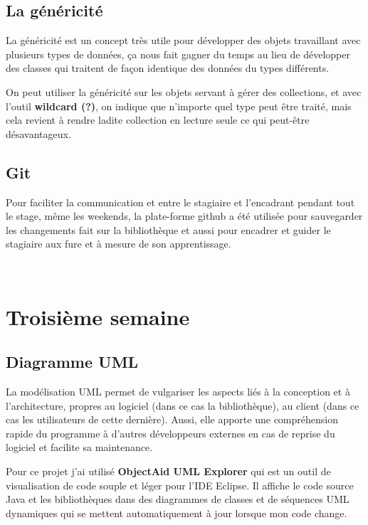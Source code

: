 \documentclass[12pt]{report}
\begin{document}
\subsection{La généricité}
La généricité est un concept très utile pour développer des objets travaillant avec plusieurs types de données, ça nous fait gagner du temps au lieu de développer des classes qui traitent de façon identique des données du types différents.\newline

On peut utiliser la généricité sur les objets servant à gérer des collections, et avec l'outil \textbf{wildcard (?)}, on indique que n'importe quel type peut être traité, mais cela revient à rendre ladite collection en lecture seule ce qui peut-être désavantageux. 

\newpage
\subsection{Git}
Pour faciliter la communication et entre le stagiaire et l'encadrant pendant tout le stage, même les weekends, la plate-forme github a été utilisée pour sauvegarder les changements fait sur la bibliothèque et aussi pour encadrer et guider le stagiaire aux fure et à mesure de son apprentissage.

~\\
\section{Troisième semaine}

\subsection{Diagramme UML}

La modélisation UML permet de vulgariser les aspects liés à la conception et à l’architecture, propres au logiciel (dans ce cas la bibliothèque), au client (dans ce cas les utilisateurs de cette dernière). Aussi, elle apporte une compréhension rapide du programme à d’autres développeurs externes en cas de reprise du logiciel et facilite sa maintenance. \newline

Pour ce projet j'ai utilisé \textbf{ObjectAid UML Explorer} qui est un outil de visualisation de code souple et léger pour l'IDE Eclipse. Il affiche le code source Java et les bibliothèques dans des diagrammes de classes et de séquences UML dynamiques qui se mettent automatiquement à jour lorsque mon code change.\newline
\end{document}
